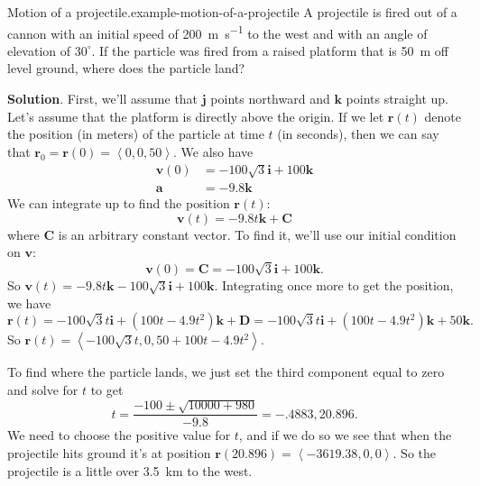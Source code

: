 \documentclass[10pt,]{book}
\numberwithin{equation}{section}
\newcommand{\vv}[1]{\mathbf{#1}}
\newcommand{\dotprod}[1]{\left\langle #1 \right\rangle}
\begin{document}
\begin{example}{Motion of a projectile.}{example-motion-of-a-projectile}%
\hypertarget{p-1309}{}%
A projectile is fired out of a cannon with an initial speed of \SI{200}{\meter\per\second} to the west and with an angle of elevation of \(30^{\circ}\). If the particle was fired from a raised platform that is \SI{50}{\meter} off level ground, where does the particle land?%
\par\smallskip%
\noindent\textbf{Solution}.\hypertarget{solution-209}{}\quad%
\hypertarget{p-1310}{}%
First, we'll assume that \(\vv{j}\) points northward and \(\vv{k}\) points straight up. Let's assume that the platform is directly above the origin. If we let \(\vv{r}(t)\) denote the position (in meters) of the particle at time \(t\) (in seconds), then we can say that \(\vv{r}_{0} = \vv{r}(0) = \dotprod{0,0,50}\). We also have%
%
\begin{align*}
\vv{v}(0) & = -100\sqrt{3}\vv{i} + 100\vv{k} \\
\vv{a} & = -9.8\vv{k} 
\end{align*}
\hypertarget{p-1311}{}%
We can integrate up to find the position \(\vv{r}(t)\):%
%
\begin{equation*}
\vv{v}(t) = -9.8t\vv{k}+\vv{C}
\end{equation*}
\hypertarget{p-1312}{}%
where \(\vv{C}\) is an arbitrary constant vector. To find it, we'll use our initial condition on \(\vv{v}\):%
%
\begin{equation*}
\vv{v}(0) = \vv{C} = -100\sqrt{3}\vv{i}+100\vv{k}.
\end{equation*}
\hypertarget{p-1313}{}%
So \(\vv{v}(t) = -9.8t\vv{k}-100\sqrt{3}\vv{i}+100\vv{k}\). Integrating once more to get the position, we have%
%
\begin{equation*}
\vv{r}(t) = -100\sqrt{3}t\vv{i}+(100t-4.9t^{2})\vv{k} + \vv{D} = -100\sqrt{3}t\vv{i} + (100t-4.9t^{2})\vv{k} + 50\vv{k}\text{.}
\end{equation*}
\hypertarget{p-1314}{}%
So \(\vv{r}(t) = \dotprod{-100\sqrt{3}t, 0, 50 + 100t - 4.9t^{2}}\).%
\par
\hypertarget{p-1315}{}%
To find where the particle lands, we just set the third component equal to zero and solve for \(t\) to get%
%
\begin{equation*}
t = \frac{-100\pm\sqrt{10000+980}}{-9.8} = -.4883,20.896.
\end{equation*}
\hypertarget{p-1316}{}%
We need to choose the positive value for \(t\), and if we do so we see that when the projectile hits ground it's at position \(\vv{r}(20.896) = \dotprod{-3619.38,0,0}.\) So the projectile is a little over \SI{3.5}{\kilo\meter} to the west.%
\end{example}
\end{document}

